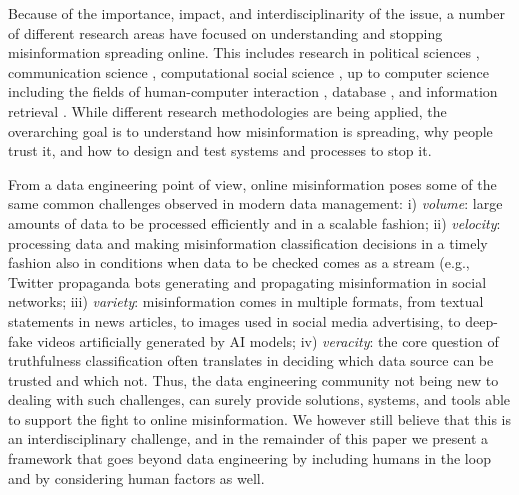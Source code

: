 \documentclass[11pt]{article}
\begin{document}
Because of the importance, impact, and interdisciplinarity of the issue, a number of different research areas have focused on understanding and stopping misinformation spreading online. This includes research in political sciences \cite{kuklinski2000misinformation}, communication science \cite{wardle2017fake}, computational social science \cite{del2016spreading}, up to computer science including the fields of human-computer interaction \cite{starbird2019disinformation}, database \cite{scrutinizer}, and information retrieval \cite{roitero2020can}. While different research methodologies are being applied, the overarching goal is to understand how misinformation is spreading, why people trust it, and how to design and test systems and processes to stop it. 

From a data engineering point of view,
online misinformation poses some of the same common challenges observed in modern data management: i)  \textit{volume}: large amounts of data to be processed efficiently and in a scalable fashion; ii) \textit{velocity}: processing data and making misinformation classification decisions in a timely fashion also in conditions when data to be checked comes as a stream (e.g., Twitter propaganda bots generating and propagating misinformation in social networks; iii) \textit{variety}: misinformation comes in multiple formats, from textual statements in news articles, to images used in social media advertising, to deep-fake videos artificially generated by AI models; iv) \textit{veracity}: the core question of truthfulness classification often translates in deciding which data source can be trusted and which not.
Thus, the data engineering community not being new to dealing with such challenges, can surely provide solutions, systems, and tools able to support the fight to online misinformation. We however still believe that this is an interdisciplinary challenge, and in the remainder of this paper we present a framework that goes beyond data engineering by including humans in the loop and by considering human factors as well.
\end{document}
